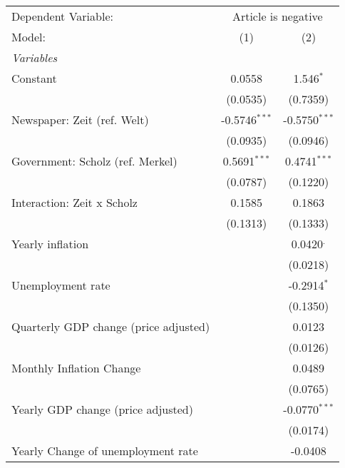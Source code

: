 
\begingroup
\centering
\begin{tabular}{lcc}
   \tabularnewline \midrule \midrule
   Dependent Variable: & \multicolumn{2}{c}{Article is negative}\\
   Model:                                & (1)             & (2)\\  
   \midrule
   \emph{Variables}\\
   Constant                              & 0.0558          & 1.546$^{*}$\\   
                                         & (0.0535)        & (0.7359)\\   
   Newspaper: Zeit (ref. Welt)           & -0.5746$^{***}$ & -0.5750$^{***}$\\   
                                         & (0.0935)        & (0.0946)\\   
   Government: Scholz (ref. Merkel)      & 0.5691$^{***}$  & 0.4741$^{***}$\\   
                                         & (0.0787)        & (0.1220)\\   
   Interaction: Zeit x Scholz            & 0.1585          & 0.1863\\   
                                         & (0.1313)        & (0.1333)\\   
   Yearly inflation                      &                 & 0.0420$^{.}$\\   
                                         &                 & (0.0218)\\   
   Unemployment rate                     &                 & -0.2914$^{*}$\\   
                                         &                 & (0.1350)\\   
   Quarterly GDP change (price adjusted) &                 & 0.0123\\   
                                         &                 & (0.0126)\\   
   Monthly Inflation Change              &                 & 0.0489\\   
                                         &                 & (0.0765)\\   
   Yearly GDP change (price adjusted)    &                 & -0.0770$^{***}$\\   
                                         &                 & (0.0174)\\   
   Yearly Change of unemployment rate    &                 & -0.0408\\   

\end{tabular}
